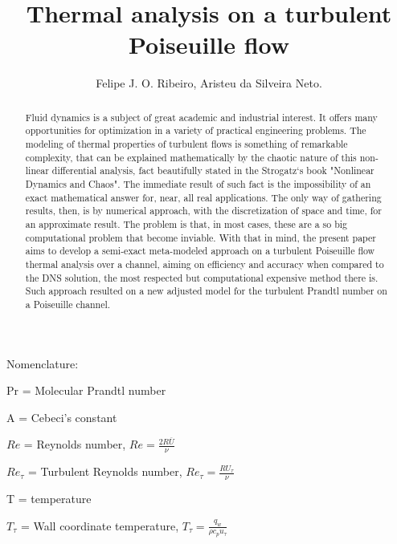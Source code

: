 \documentclass[10pt]{article} %
\title{ \loll Thermal analysis on a turbulent Poiseuille flow}
\author{Felipe J. O. Ribeiro, Aristeu da Silveira Neto.}
\begin{document}
\maketitle


\begin{abstract}
	\noindent Fluid dynamics is a subject of great academic and industrial interest. It offers many opportunities for optimization in a variety of practical engineering problems. The modeling of thermal properties of turbulent flows is something of remarkable complexity, that can be explained mathematically by the chaotic nature of this non-linear differential analysis, fact beautifully stated in the Strogatz`s book "Nonlinear Dynamics and Chaos". The immediate result of such fact is the impossibility of an exact mathematical answer for, near, all real applications. The only way of gathering results, then, is by numerical approach, with the discretization of space and time, for an approximate result. The problem is that, in most cases, these are a so big computational problem that become inviable. With that in mind, the present paper aims to develop a semi-exact meta-modeled approach on a turbulent Poiseuille flow thermal analysis over a channel, aiming on efficiency and accuracy when compared to the DNS solution, the most respected but computational expensive method there is. Such approach resulted on a new adjusted model for the turbulent Prandtl number on a Poiseuille channel.
\end{abstract} 

\vspace{8.0mm}

\begin{LARGE}
	Nomenclature: 
\end{LARGE} 


	Pr = Molecular Prandtl number
	
	A = Cebeci's constant
	
	
	$Re$ = Reynolds number, $Re = \frac{2R \overline{U}}{\nu}$
	
	
	$Re_\tau$ = Turbulent Reynolds number, $Re_\tau = \frac{R U_\tau}{\nu}$
	
	
	
	T = temperature
	
	
	
	$T_\tau$ = Wall coordinate temperature, $T_\tau = \frac{q_w}{\rho c_p u_\tau}$ 
	
\end{document}
